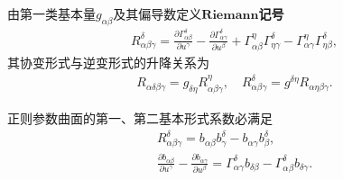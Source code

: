 \documentclass[../../main.tex]{subfiles}%
\begin{document}
\begin{definition}
由第一类基本量$g_{\alpha\beta}$及其偏导数定义$\mathbf{Riemann}$\textbf{记号}
\begin{align}
R^\delta_{\alpha\beta\gamma} = \frac{\partial \Gamma^\delta_{\alpha\beta}}{\partial u^\gamma}-\frac{\partial \Gamma^\delta_{\alpha\gamma}}{\partial u^\beta}+\Gamma^\eta_{\alpha\beta}\Gamma^\delta_{\eta\gamma}-\Gamma^\eta_{\alpha\gamma}\Gamma^\delta_{\eta\beta}, \label{eq:riemann_up}
\end{align}
其协变形式与逆变形式的升降关系为
\begin{align}
R_{\alpha\delta\beta\gamma} = g_{\delta\eta}R^\eta_{\alpha\beta\gamma},\quad R^\delta_{\alpha\beta\gamma} = g^{\delta\eta}R_{\alpha\eta\beta\gamma}. \label{eq:riemann_cov}
\end{align}
\end{definition}

\begin{theorem}
正则参数曲面的第一、第二基本形式系数必满足
\begin{gather}
R^\delta_{\alpha\beta\gamma} = b_{\alpha\beta}b^\delta_\gamma - b_{\alpha\gamma}b^\delta_\beta, \tag{Gauss方程}\label{eq:gauss_eq}\\
\frac{\partial b_{\alpha\beta}}{\partial u^\gamma}-\frac{\partial b_{\alpha\gamma}}{\partial u^\beta} = \Gamma^\delta_{\alpha\gamma}b_{\delta\beta}-\Gamma^\delta_{\alpha\beta}b_{\delta\gamma}. \tag{Codazzi方程}\label{eq:codazzi_eq}
\end{gather}
\end{theorem}
\end{document}

